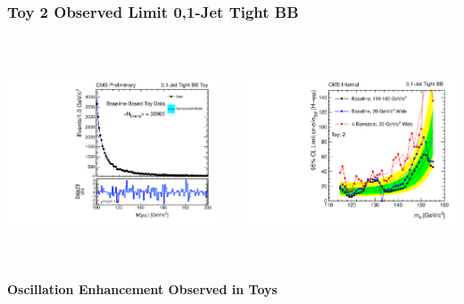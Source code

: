 \documentclass{beamer}
\begin{document}
\begin{frame}
\frametitle{Toy 2 Observed Limit 0,1-Jet Tight BB}
  \vspace{-1.5em}
  \begin{columns}[c]
    \column{60mm}
      \begin{center}
         \includegraphics[height=60mm]{wigglesStudy/toyFit3_Jets01PassPtG10BB_8TeV.pdf}
      \end{center}
    \column{60mm}
      \begin{center}
         \includegraphics[height=60mm]{wigglesStudy/compareLimits_TightBB_toy2.pdf}
      \end{center}
  \end{columns}
  \begin{center}
    \textbf{Oscillation Enhancement Observed in Toys}
  \end{center}
\end{frame}
\end{document}
